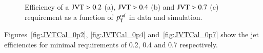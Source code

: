 \documentclass{atlasnote}
\begin{document}
\begin{figure}[!htbp]
  \centering
  \caption{Efficiency of a ${\rm JVT}>0.2$ (a), ${\rm JVT}>0.4$ (b) and ${\rm JVT}>0.7$ (c) requirement as a function of $p_{\mathrm{T}}^{\rm ref}$ in data and simulation.}
  \label{fig:JVTCalibration}
\end{figure}
Figures~\ref{fig:JVTCal_0p2}, \ref{fig:JVTCal_0p4} and~\ref{fig:JVTCal_0p7} show the jet efficiencies for  minimal \JVT requirements of 0.2, 0.4 and 0.7 respectively. 
\end{document}
